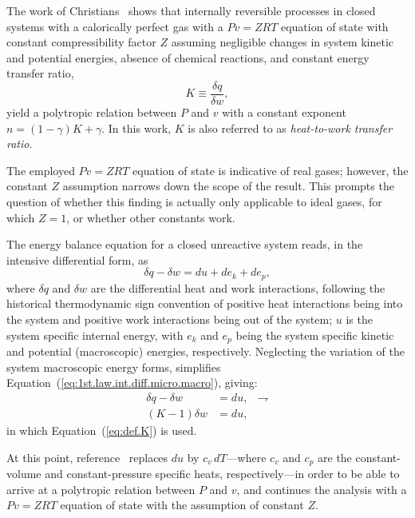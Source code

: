 \documentclass[fleqn,11pt]{SelfArx}
\begin{document}
    The  work  of  Christians~\cite{2012-ChristiansJ-IntJMechEngEduc}  shows   that   internally
    reversible processes in closed systems with a calorically perfect gas  with  a  $Pv  =  ZRT$
    equation of state with constant compressibility factor $Z$ assuming  negligible  changes  in
    system kinetic and potential energies, absence of chemical reactions,  and  constant  energy
    transfer ratio,
    \begin{equation}
        K \equiv \frac{\delta q}{\delta w},
        \label{eq:def.K}
    \end{equation}
    \noindent yield a polytropic relation between $P$ and $v$ with a constant exponent $n = (1 -
    \gamma)K + \gamma$. In this work, $K$ is also referred  to  as  \emph{heat-to-work  transfer
    ratio}.

    The employed $Pv = ZRT$ equation of state is indicative of real gases; however, the constant
    $Z$ assumption narrows down the scope of the result. This prompts the  question  of  whether
    this finding is actually only applicable to ideal gases, for which $Z=1$, or  whether  other
    constants work.

    The energy balance  equation  for  a  closed  unreactive  system  reads,  in  the  intensive
    differential form, as
    \begin{equation}
        \delta q - \delta w = du + de_k + de_p,
        \label{eq:1st.law.int.diff.micro.macro}
    \end{equation}
    \noindent where $\delta q$ and $\delta w$ are the differential heat and  work  interactions,
    following the historical thermodynamic sign convention of positive heat  interactions  being
    into the system and positive work interactions being out of the system; $u$  is  the  system
    specific internal energy, with $e_k$  and  $e_p$  being  the  system  specific  kinetic  and
    potential (macroscopic) energies, respectively.  Neglecting  the  variation  of  the  system
    macroscopic  energy  forms,   simplifies   Equation~(\ref{eq:1st.law.int.diff.micro.macro}),
    giving:
    \begin{align}
        \delta q - \delta w & = du, & \rightharpoondown
        \label{eq:1st.law.int.diff} \\
        (K-1)\delta w & = du,
        \label{eq:1st.law.int.diff.K}
    \end{align}
    \noindent in which Equation~(\ref{eq:def.K}) is used.

    At  this   point,   reference~\cite{2012-ChristiansJ-IntJMechEngEduc}   replaces   $du$   by
    $c_v\,dT$---where $c_v$ and $c_p$ are the  constant-volume  and  constant-pressure  specific
    heats, respectively---in order to be able to arrive at a polytropic relation between $P$ and
    $v$, and continues the analysis with a $Pv = ZRT$ equation of state with the  assumption  of
    constant $Z$.
\end{document}
